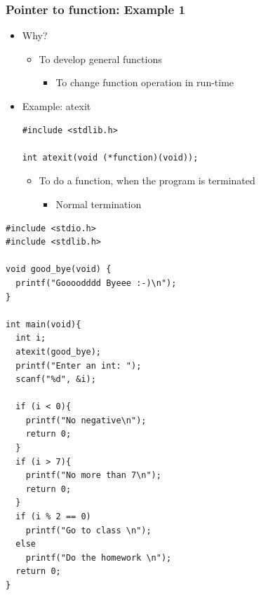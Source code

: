 \documentclass{../c-lecture}
\begin{document}
\begin{frame}[fragile]
  \frametitle{Pointer to function: Example 1}
  \begin{itemize}
    \item Why?
    \begin{itemize}
      \item To develop general functions
      \begin{itemize}
        \item To change function operation in run-time
      \end{itemize}
    \end{itemize}
    \item Example: atexit
    \begin{verbatim}
#include <stdlib.h>

int atexit(void (*function)(void));
    \end{verbatim}
    \begin{itemize}
      \item To do a function, when the program is terminated
      \begin{itemize}
        \item Normal termination
      \end{itemize}
    \end{itemize}
  \end{itemize}
\end{frame}

\begin{frame}[fragile]
  \begin{verbatim}
#include <stdio.h>
#include <stdlib.h>

void good_bye(void) {
  printf("Goooodddd Byeee :-)\n");
}

int main(void){
  int i;
  atexit(good_bye);
  printf("Enter an int: ");
  scanf("%d", &i);

  if (i < 0){
    printf("No negative\n");
    return 0;
  }
  if (i > 7){
    printf("No more than 7\n");
    return 0;
  }
  if (i % 2 == 0)
    printf("Go to class \n");
  else
    printf("Do the homework \n");
  return 0;
}
  \end{verbatim}
\end{frame}
\end{document}
